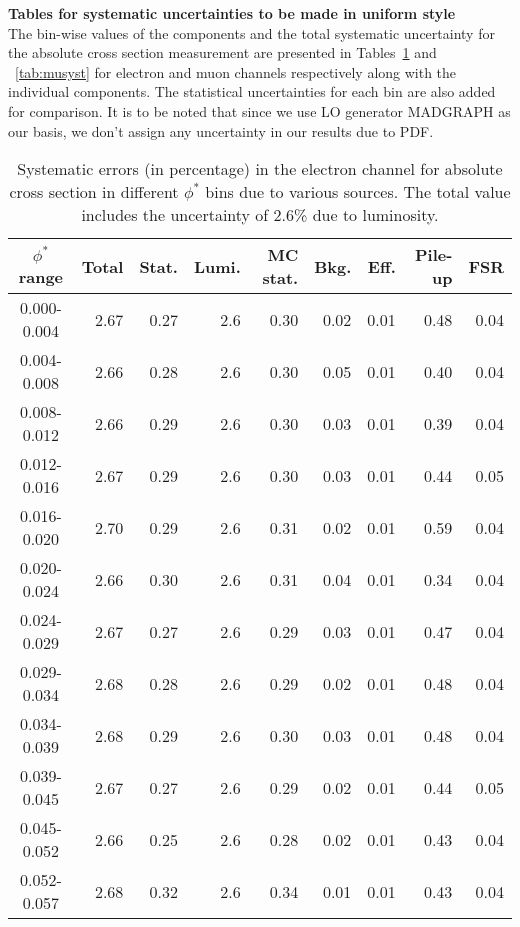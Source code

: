 {\bf Tables for systematic uncertainties to be made in uniform style}\\
The  bin-wise values  of the components and the  total systematic uncertainty for the absolute cross section measurement are presented in Tables~\ref{tab:elsyst}  and ~\ref{tab:musyst} for electron and muon channels respectively along with the individual  components. The statistical uncertainties for each bin are also added for comparison. It is to be noted that since we use LO generator {\sc MADGRAPH} as our basis, we don't assign any uncertainty in our results due to PDF.

\begin{table}
\caption{Systematic errors (in percentage) in the electron channel for absolute cross section in different $\phi^*$ bins due to various sources. The total value includes the uncertainty of 2.6\% due to luminosity. } 
\label{tab:elsyst}
\begin{center}
\begin{tabular}{ | c | r | r | r | r | r | r | r | r |}
\hline
$\phi^*$ range & Total & Stat. & Lumi.& MC stat. & Bkg. & Eff. & Pile-up & FSR \\ \hline
0.000-0.004 & 2.67 & 0.27 & 2.6 &0.30 & 0.02 & 0.01 & 0.48 & 0.04  \\ \hline
0.004-0.008 & 2.66 & 0.28 & 2.6 &0.30 & 0.05 & 0.01 & 0.40 & 0.04  \\ \hline
0.008-0.012 & 2.66 & 0.29 & 2.6 &0.30 & 0.03 & 0.01 & 0.39 & 0.04  \\ \hline
0.012-0.016 & 2.67 & 0.29 & 2.6 &0.30 & 0.03 & 0.01 & 0.44 & 0.05  \\ \hline
0.016-0.020 & 2.70 & 0.29 & 2.6 &0.31 & 0.02 & 0.01 & 0.59 & 0.04  \\ \hline
0.020-0.024 & 2.66 & 0.30 & 2.6 &0.31 & 0.04 & 0.01 & 0.34 & 0.04  \\ \hline
0.024-0.029 & 2.67 & 0.27 & 2.6 &0.29 & 0.03 & 0.01 & 0.47 & 0.04  \\ \hline
0.029-0.034 & 2.68 & 0.28 & 2.6 &0.29 & 0.02 & 0.01 & 0.48 & 0.04  \\ \hline
0.034-0.039 & 2.68 & 0.29 & 2.6 &0.30 & 0.03 & 0.01 & 0.48 & 0.04  \\ \hline
0.039-0.045 & 2.67 & 0.27 & 2.6 &0.29 & 0.02 & 0.01 & 0.44 & 0.05  \\ \hline
0.045-0.052 & 2.66 & 0.25 & 2.6 &0.28 & 0.02 & 0.01 & 0.43 & 0.04  \\ \hline
0.052-0.057 & 2.68 & 0.32 & 2.6 &0.34 & 0.01 & 0.01 & 0.43 & 0.04  \\ \hline

\end{tabular}
\end{center}
\end{table}
